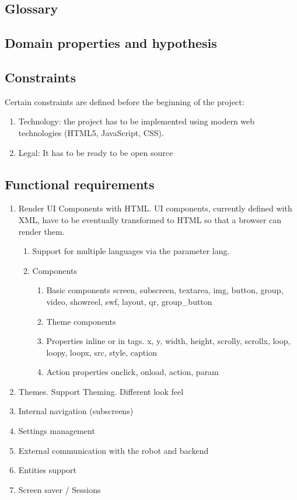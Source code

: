 \subsection{Glossary}

\subsection{Domain properties and hypothesis}
\subsection{Constraints}
Certain constraints are defined before the beginning of the project:
\begin{enumerate}
    \item Technology: the project has to be implemented using modern web technologies (HTML5, JavaScript, CSS).
    \item Legal: It has to be ready to be open source
\end{enumerate}


\subsection{Functional requirements}
\begin{enumerate}
    \item Render UI Components with HTML. UI components, currently defined with XML, have to be eventually transformed to HTML so that a browser can render them.
    \begin{enumerate}
        \item Support for multiple languages via the parameter lang.
        \item Components 
        \begin{enumerate}
            \item Basic components screen, subscreen, textarea, img, button, group, video, showreel, swf, layout, qr, group\_button
            \item Theme components
            \item Properties inline or in tags. x, y, width, height, scrolly, scrollx, loop, loopy, loopx, src, style, caption
            \item Action properties onclick, onload, action, param
        \end{enumerate}
        
    \end{enumerate}
    \item Themes. Support Theming. Different look feel
    \item Internal navigation (subscreens)
    \item Settings management
    \item External communication with the robot and backend
    \item Entities support
    \item Screen saver / Sessions
\end{enumerate}


